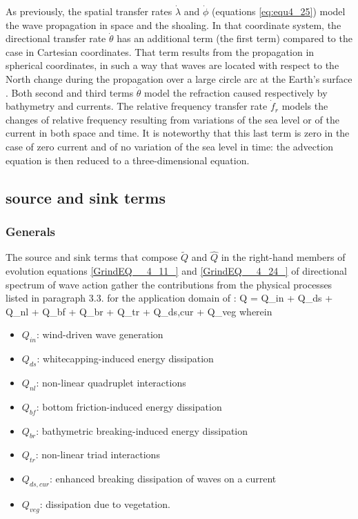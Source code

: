 As previously, the spatial transfer rates $\dot{\lambda }$ and $\dot{\phi }$ (equations \ref{eq:equ4_25}) model the wave propagation in space and the shoaling. In that coordinate system, the directional transfer rate $\dot{\theta }$ has an additional term (the first term) compared to the case in Cartesian coordinates. That term results from the propagation in spherical coordinates, in such a way that waves are located with respect to the North change during the propagation over a large circle arc at the Earth's surface \cite{Wamdi1988} \cite{Komen1994}. Both second and third terms $\dot{\theta }$ model the refraction caused respectively by bathymetry and currents. The relative frequency transfer rate $\dot{f}_{r} $  models the changes of relative frequency resulting from variations of the sea level or of the current in both space and time. It is noteworthy that this last term is zero in the case of zero current and of no variation of the sea level in time: the advection equation is then reduced to a three-dimensional equation.


\subsection{ \tomawac source and sink terms}
\label{se:sourceterm}

\subsubsection{ Generals}

 The source and sink terms that compose $\tilde{Q}$ and $\hat{Q}$ in the right-hand members of evolution equations \eqref{GrindEQ__4_11_} and \eqref{GrindEQ__4_24_} of directional spectrum of wave action gather the contributions from the physical processes listed in paragraph 3.3. for the application domain of \tomawac:
\bequ
\label{eq:semimp}
 Q = Q_{in} + Q_{ds} + Q_{nl} + Q_{bf} + Q_{br} + Q_{tr} + Q_{ds,cur} + Q_{veg}
\eequ
 wherein 
\begin{itemize}
\item $Q_{in}$: wind-driven wave generation
\item $Q_{ds}$: whitecapping-induced energy dissipation
\item $Q_{nl}$: non-linear quadruplet interactions
\item $Q_{bf}$: bottom friction-induced energy dissipation
\item $Q_{br}$: bathymetric breaking-induced energy dissipation
\item $Q_{tr}$: non-linear triad interactions
\item $Q_{ds,cur}$: enhanced breaking dissipation of waves on a current
\item $Q_{veg}$: dissipation due to vegetation.
\end{itemize}

